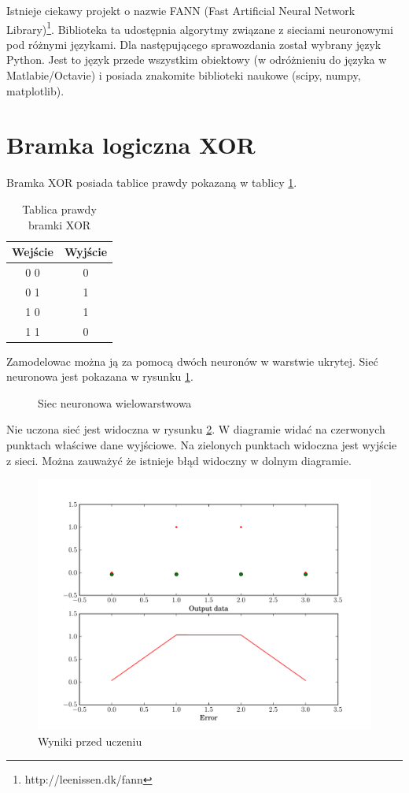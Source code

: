 \documentclass[pointlessnumbers, abstracton, headsepline, a4paper]{scrartcl}
\begin{document}
Istnieje ciekawy projekt o nazwie FANN (Fast Artificial Neural Network Library)\footnote{http://leenissen.dk/fann}. Biblioteka ta udostępnia algorytmy związane z sieciami neuronowymi pod różnymi językami. Dla następującego sprawozdania został wybrany język Python. Jest to język przede wszystkim obiektowy (w odróżnieniu do języka w Matlabie/Octavie) i posiada znakomite biblioteki naukowe (scipy, numpy, matplotlib).

\section{Bramka logiczna XOR}

Bramka XOR posiada tablice prawdy pokazaną w tablicy \ref{tab:xor}.

\begin{table}[h]
\centering
\begin{tabular}[t]{c|c}
Wejście & Wyjście \\
\hline
0 0 & 0 \\
0 1 & 1 \\
1 0 & 1 \\
1 1 & 0 \\
\end{tabular}
\caption{\label{tab:xor}Tablica prawdy bramki XOR}
\end{table}

Zamodelowac można ją za pomocą dwóch neuronów w warstwie ukrytej. Sieć neuronowa jest pokazana w rysunku \ref{fig:xor}.

\begin{figure}[!h]
\centering

\caption{\label{fig:xor}Siec neuronowa wielowarstwowa}
\end{figure}

Nie uczona sieć jest widoczna w rysunku \ref{fig:xor_unlearned}. W diagramie widać na czerwonych punktach właściwe dane wyjściowe. Na zielonych punktach widoczna jest wyjście z sieci. Można zauważyć że istnieje błąd widoczny w dolnym diagramie.

\begin{figure}[!h]
\centering
\includegraphics[scale=0.8]{src/xor/xor_untrained.pdf}\caption{\label{fig:xor_unlearned}Wyniki przed uczeniu}
\end{figure}
\end{document}
